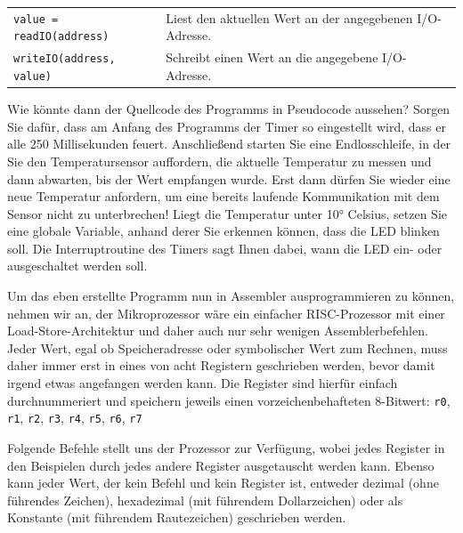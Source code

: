 \bigskip
{
    \setlength{\tabcolsep}{0pt}
    \small

    \begin{tabularx}{\textwidth}{p{}X}
        \texttt{value = readIO(address)}
        &
        Liest den aktuellen Wert an der angegebenen I/O-Adresse.
        \\

        \texttt{writeIO(address, value)}
        &
        Schreibt einen Wert an die angegebene I/O-Adresse.
        \\
    \end{tabularx}
}

Wie könnte dann der Quellcode des Programms in Pseudocode aussehen? Sorgen Sie
dafür, dass am Anfang des Programms der Timer so eingestellt wird, dass er alle
250 Millisekunden feuert. Anschließend starten Sie eine Endlosschleife, in der
Sie den Temperatursensor auffordern, die aktuelle Temperatur zu messen und dann
abwarten, bis der Wert empfangen wurde. Erst dann dürfen Sie wieder eine neue
Temperatur anfordern, um eine bereits laufende Kommunikation mit dem Sensor nicht
zu unterbrechen! Liegt die Temperatur unter 10° Celsius, setzen Sie eine globale
Variable, anhand derer Sie erkennen können, dass die LED blinken soll. Die
Interruptroutine des Timers sagt Ihnen dabei, wann die LED ein- oder ausgeschaltet
werden soll.

\bigskip
\teilaufgabe
Um das eben erstellte Programm nun in Assembler ausprogrammieren zu können,
nehmen wir an, der Mikroprozessor wäre ein einfacher RISC-Prozessor mit einer
Load-Store-Architektur und daher auch nur sehr wenigen Assemblerbefehlen. Jeder
Wert, egal ob Speicheradresse oder symbolischer Wert zum Rechnen, muss daher
immer erst in eines von acht Registern geschrieben werden, bevor damit irgend
etwas angefangen werden kann. Die Register sind hierfür einfach durchnummeriert
und speichern jeweils einen vorzeichenbehafteten 8-Bitwert:
\texttt{r0}, \texttt{r1}, \texttt{r2}, \texttt{r3}, \texttt{r4}, \texttt{r5},
\texttt{r6}, \texttt{r7}

Folgende Befehle stellt uns der Prozessor zur Verfügung, wobei jedes Register
in den Beispielen durch jedes andere Register ausgetauscht werden kann. Ebenso
kann jeder Wert, der kein Befehl und kein Register ist, entweder dezimal (ohne
führendes Zeichen), hexadezimal (mit führendem Dollarzeichen) oder als Konstante
(mit führendem Rautezeichen) geschrieben werden.

